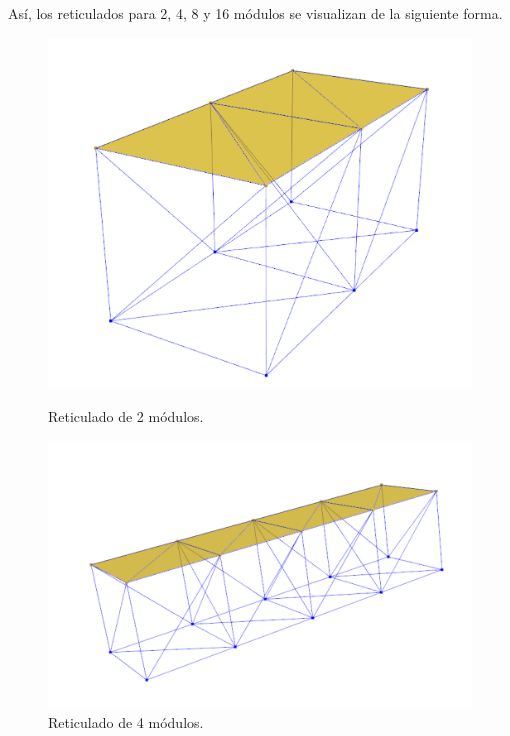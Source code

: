 \newpage

Así, los reticulados para 2, 4, 8 y 16 módulos se visualizan de la siguiente forma.

\begin{figure}[H]
    \begin{minipage}[b]{0.5\textwidth}
        \centering
        \includegraphics[width=\textwidth]{FOTOS/2.png}
        \caption{Reticulado de 2 módulos.}
    \end{minipage}
    \hfill
    \begin{minipage}[b]{0.5\textwidth}
        \centering
        \includegraphics[width=\textwidth]{FOTOS/4.png}
        \caption{Reticulado de 4 módulos.}
    \end{minipage}
\end{figure}

